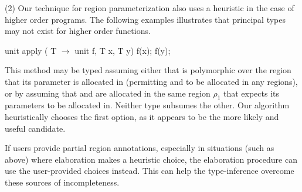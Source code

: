   (2) Our technique for region parameterization also uses a heuristic in the case of
higher order programs. The following examples illustrates that principal types may
not exist for higher order functions.
\begin{codejava}
    unit apply ( T $\rightarrow$ unit f, T x, T y) { f(x); f(y); }
\end{codejava}
This method may be typed assuming either that  is polymorphic over the region
that its parameter is allocated in (permitting  and  to be allocated in any
regions), or by assuming that  and  are allocated in the same region $\rho_1$
that  expects its parameters to be allocated in. Neither type subsumes the other.
Our algorithm heuristically chooses the first option, as it appears to be the more likely
and useful candidate.





If users provide partial region annotations, especially in situations (such as above) where elaboration
makes a heuristic choice, the elaboration procedure can use the user-provided choices instead.
This can help the type-inference overcome these sources of incompleteness.


